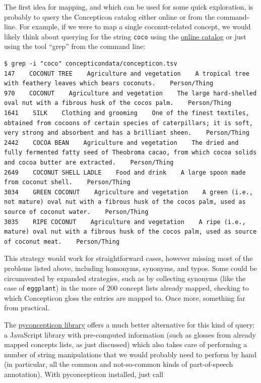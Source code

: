 \documentclass[
  a4paper,
  14pt,
  oneside,
  tablecaptionabove
]{scrbook}
\newcommand{\passthrough}[1]{#1}
\begin{document}
The first idea for mapping, and which can be used for some quick
exploration, is probably to query the Concepticon catalog either online
or from the command-line. For example, if we were to map a single
coconut-related concept, we would likely think about querying for the
string \passthrough{\lstinline!coco!} using the
\href{https://concepticon.clld.org/parameters}{online catalog} or just
using the tool \enquote{grep} from the command line:

\begin{lstlisting}
$ grep -i "coco" concepticondata/concepticon.tsv
147    COCONUT TREE    Agriculture and vegetation    A tropical tree with feathery leaves which bears coconuts.    Person/Thing
970    COCONUT    Agriculture and vegetation    The large hard-shelled oval nut with a fibrous husk of the cocos palm.    Person/Thing
1641    SILK    Clothing and grooming    One of the finest textiles, obtained from cocoons of certain species of caterpillars; it is soft, very strong and absorbent and has a brilliant sheen.    Person/Thing
2442    COCOA BEAN    Agriculture and vegetation    The dried and fully fermented fatty seed of Theobroma cacao, from which cocoa solids and cocoa butter are extracted.    Person/Thing
2649    COCONUT SHELL LADLE    Food and drink    A large spoon made from coconut shell.    Person/Thing
3034    GREEN COCONUT    Agriculture and vegetation    A green (i.e., not mature) oval nut with a fibrous husk of the cocos palm, used as source of coconut water.    Person/Thing
3035    RIPE COCONUT    Agriculture and vegetation    A ripe (i.e., mature) oval nut with a fibrous husk of the cocos palm, used as source of coconut meat.    Person/Thing
\end{lstlisting}

This strategy would work for straightforward cases, however missing most
of the problems listed above, including homonyms, synonyms, and typos.
Some could be circumvented by expanded strategies, such as by collecting
synonyms (like the case of \passthrough{\lstinline!eggplant!}) in the
more of 200 concept lists already mapped, checking to which Concepticon
gloss the entries are mapped to. Once more, something far from
practical.

The \href{https://pypi.org/project/pyconcepticon/}{pyconcepticon
library} offers a much better alternative for this kind of query: a
JavaScript library with pre-computed information (such as glosses from
already mapped concepts lists, as just discussed) which also takes care
of performing a number of string manipulations that we would probably
need to perform by hand (in particular, all the common and not-so-common
kinds of part-of-speech annotation). With pyconcepticon installed, just
call
\end{document}
